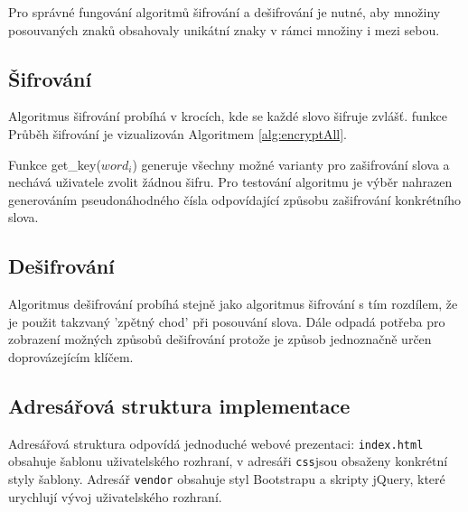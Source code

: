\documentclass[12pt,a4paper]{article}
\begin{document}
\bigskip \noindent
Pro správné fungování algoritmů šifrování a dešifrování je nutné, aby množiny posouvaných znaků obsahovaly unikátní znaky v rámci množiny i mezi sebou.
\newpage
\subsection{Šifrování}
Algoritmus šifrování probíhá v krocích, kde se každé slovo šifruje zvlášť. funkce
Průběh šifrování je vizualizován Algoritmem \ref{alg:encryptAll}. 

Funkce get\_key($word_i$) generuje všechny možné varianty pro zašifrování slova a nechává uživatele zvolit žádnou šifru. Pro testování algoritmu je výběr nahrazen generováním pseudonáhodného čísla odpovídající způsobu zašifrování konkrétního slova. \\

\subsection{Dešifrování}
Algoritmus dešifrování probíhá stejně jako algoritmus šifrování s tím rozdílem, že je použit takzvaný 'zpětný chod' při posouvání slova. Dále odpadá potřeba pro zobrazení možných způsobů dešifrování protože je způsob jednoznačně určen doprovázejícím klíčem. \\

\subsection{Adresářová struktura implementace}
Adresářová struktura odpovídá jednoduché webové prezentaci:
\texttt{index.html} obsahuje šablonu uživatelského rozhraní, v adresáři \texttt{css}jsou obsaženy konkrétní styly šablony. Adresář \texttt{vendor} obsahuje styl Bootstrapu a skripty jQuery, které urychlují vývoj uživatelského rozhraní.
\end{document}
